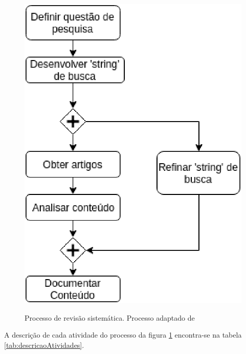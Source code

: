 	 	\begin{figure}[]
			\centering
			\caption{Processo de revisão sistemática. Processo adaptado de \cite{Kitchenham}}
			\includegraphics[scale=0.8]{figuras/processo_revisao_sistematica.eps}
			\label{img:processo_revisao_sistematica}
		\end{figure}

		A descrição de cada atividade do processo da figura \ref{img:processo_revisao_sistematica} encontra-se na tabela \ref{tab:descricaoAtividades}.

